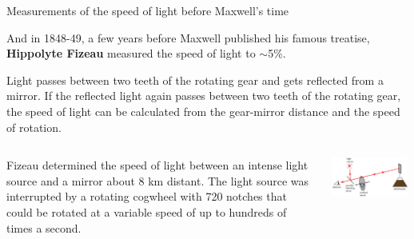 \begin{frame}{Measurements of the speed of light before Maxwell's time}

And in 1848-49, a few years before Maxwell published his famous treatise,
{\bf Hippolyte Fizeau} measured the speed of light to $\sim$5\%.\\

\vspace{0.2cm}

Light passes between two teeth of the rotating gear and gets reflected from a mirror.
     If the reflected light again passes between two teeth of the rotating gear,
     the speed of light can be calculated from the gear-mirror distance and the speed of rotation.\\

\vspace{0.2cm}

\begin{columns}
  \begin{column}{0.40\textwidth}
  {\small
     Fizeau determined the speed of light between an intense light source and a mirror about 8 km distant.
     The light source was interrupted by a rotating cogwheel with 720 notches
     that could be rotated at a variable speed of up to hundreds of times a second.\\
  }
  \end{column}
  \begin{column}{0.60\textwidth}
   \begin{center}
    \includegraphics[width=0.98\textwidth]{./images/schematics/fizeau_experiment_absolute_speed_01.png}\\
   \end{center}
  \end{column}
\end{columns}

\end{frame}


